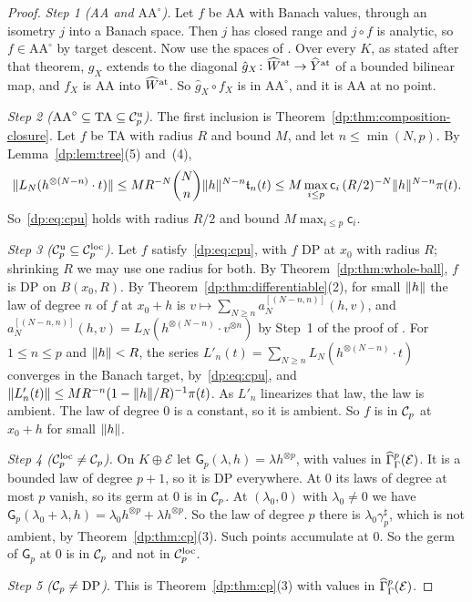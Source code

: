 \begin{proof}
\emph{Step 1 (AA and $\mathrm{AA}^\circ$).} Let $f$ be AA with Banach values, through an isometry $j$ into a Banach space. Then $j$ has closed range and $j\circ f$ is analytic, so $f\in\mathrm{AA}^\circ$ by target descent. Now use the spaces of \cite[Theorem~14.17]{I}. Over every $K$, as stated after that theorem, $g_X$ extends to the diagonal $\hat g_X\colon\widehat W^{\rm at}\to\widehat Y^{\rm at}$ of a bounded bilinear map, and $f_X$ is AA into $\widehat W^{\rm at}$. So $\hat g_X\circ f_X$ is in $\mathrm{AA}^\circ$, and it is AA at no point.

\emph{Step 2 ($\mathrm{AA}^\circ\subseteq\mathrm{TA}\subseteq\mathcal{C}_p^{\rm u}$).} The first inclusion is Theorem~\ref{dp:thm:composition-closure}. Let $f$ be TA with radius $R$ and bound $M$, and let $n\le\min(N,p)$. By Lemma~\ref{dp:lem:tree}(5) and~(4),
\[
 \lVert L_N(h^{\otimes(N-n)}\cdot t)\rVert\le MR^{-N}\binom Nn\lVert h\rVert^{N-n}\mathfrak t_n(t)\le M\max_{i\le p}\mathsf c_i\,(R/2)^{-N}\lVert h\rVert^{N-n}\pi(t).
\]
So~\eqref{dp:eq:cpu} holds with radius $R/2$ and bound $M\max_{i\le p}\mathsf c_i$.

\emph{Step 3 ($\mathcal{C}_p^{\rm u}\subseteq\mathcal{C}_p^{\rm loc}$).} Let $f$ satisfy~\eqref{dp:eq:cpu}, with $f$ DP at $x_0$ with radius $R$; shrinking $R$ we may use one radius for both. By Theorem~\ref{dp:thm:whole-ball}, $f$ is DP on $B(x_0,R)$. By Theorem~\ref{dp:thm:differentiable}(2), for small $\lVert h\rVert$ the law of degree $n$ of $f$ at $x_0+h$ is $v\mapsto\sum_{N\ge n}a_N^{[(N-n,n)]}(h,v)$, and $a_N^{[(N-n,n)]}(h,v)=L_N(h^{\otimes(N-n)}\cdot v^{\otimes n})$ by Step~1 of the proof of \cite[Lemma~Q.4]{I}. For $1\le n\le p$ and $\lVert h\rVert<R$, the series $L'_n(t)=\sum_{N\ge n}L_N(h^{\otimes(N-n)}\cdot t)$ converges in the Banach target, by~\eqref{dp:eq:cpu}, and $\lVert L'_n(t)\rVert\le MR^{-n}(1-\lVert h\rVert/R)^{-1}\pi(t)$. As $L'_n$ linearizes that law, the law is ambient. The law of degree $0$ is a constant, so it is ambient. So $f$ is in $\mathcal{C}_p$ at $x_0+h$ for small $\lVert h\rVert$.

\emph{Step 4 ($\mathcal{C}_p^{\rm loc}\ne\mathcal{C}_p$).} On $K\oplus\mathcal E$ let $\mathsf G_p(\lambda,h)=\lambda h^{\otimes p}$, with values in $\widehat\Gamma^p_\Gamma(\mathcal E)$. It is a bounded law of degree $p+1$, so it is DP everywhere. At $0$ its laws of degree at most $p$ vanish, so its germ at $0$ is in $\mathcal{C}_p$. At $(\lambda_0,0)$ with $\lambda_0\ne0$ we have $\mathsf G_p(\lambda_0+\lambda,h)=\lambda_0h^{\otimes p}+\lambda h^{\otimes p}$. So the law of degree $p$ there is $\lambda_0\gamma^\sharp_p$, which is not ambient, by Theorem~\ref{dp:thm:cp}(3). Such points accumulate at $0$. So the germ of $\mathsf G_p$ at $0$ is in $\mathcal{C}_p$ and not in $\mathcal{C}_p^{\rm loc}$.

\emph{Step 5 ($\mathcal{C}_p\ne\mathrm{DP}$).} This is Theorem~\ref{dp:thm:cp}(3) with values in $\widehat\Gamma^p_\Gamma(\mathcal E)$.
\end{proof}

